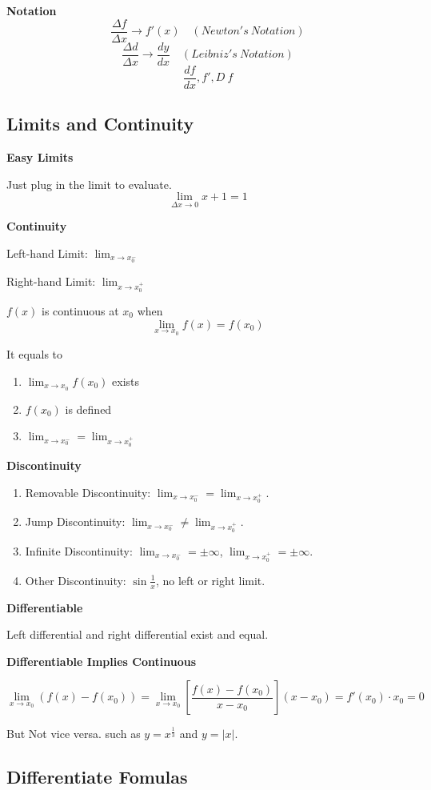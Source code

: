 \documentclass{article}
\newcommand\limitx[1]{\lim_{x \to #1}}
\newcommand\limitdeltaxzero{\lim_{\Delta x \to 0}}
\begin{document}
\textbf{Notation}
$$\frac{\Delta f}{\Delta x} \rightarrow f'(x) \quad (Newton's \  Notation)$$
$$\frac{\Delta d}{\Delta x} \rightarrow \frac{dy}{dx} \quad (Leibniz's \  Notation)$$
$$\frac{df}{dx}, f', D\ f$$

\subsection{Limits and Continuity}

\textbf{Easy Limits}

Just plug in the limit to evaluate.
$$\limitdeltaxzero x + 1 = 1$$

\textbf{Continuity}

Left-hand Limit: $\limitx{x_0^-}$

Right-hand Limit: $\limitx{x_0^+}$

$f(x)$ is continuous at $x_0$ when
$$\limitx{x_0} f(x) = f(x_0)$$

It equals to
\begin{enumerate}
\item $\limitx{x_0}f(x_0)$ exists
\item $f(x_0)$ is defined
\item $\limitx{x_0^-} = \limitx{x_0^+}$
\end{enumerate}

\textbf{Discontinuity}

\begin{enumerate}
\item Removable Discontinuity: $\limitx{x_0^-} = \limitx{x_0^+}$.
\item Jump Discontinuity: $\limitx{x_0^-} \not= \limitx{x_0^+}$.
\item Infinite Discontinuity: $\limitx{x_0^-} = \pm\infty$, $\limitx{x_0^+} = \pm\infty$.
\item Other Discontinuity: $\sin{\frac{1}{x}}$, no left or right limit.
\end{enumerate}

\textbf{Differentiable}

Left differential and right differential exist and equal.

\textbf{Differentiable Implies Continuous}

$$\limitx{x_0}{(f(x)-f(x_0))} = \limitx{x_0}\left[{\frac{f(x)-f(x_0)}{x-x_0}}\right](x-x_0) = f'(x_0) \cdot x_0 = 0$$

But Not vice versa.
such as $y = x^{\frac{1}{3}}$ and $y = \left|x\right|$.

\subsection{Differentiate Fomulas}
\end{document}
